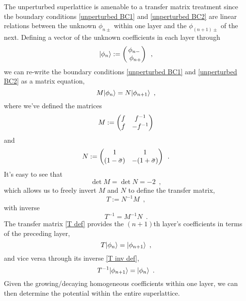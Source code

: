 The unperturbed superlattice is amenable to a transfer matrix treatment since the boundary conditions \eqref{unperturbed BC1} and \eqref{unperturbed BC2} are linear relations between the unknown $\phi_{n\pm}$ within one layer and the $\phi_{(n+1)\pm}$ of the next.  Defining a vector of the unknown coefficients in each layer through
\begin{equation}
    \label{phi vec def}
    \lvert\phi_n\rangle:=\begin{pmatrix}
    \phi_{n-}
    \\\
    \phi_{n+}
    \end{pmatrix}
    \,\,\,,
\end{equation}
we can re-write the boundary conditions \eqref{unperturbed BC1} and \eqref{unperturbed BC2} as a matrix equation,
\begin{equation}
    \label{matrix BC}
    M\lvert\phi_n\rangle= N\lvert\phi_{n+1}\rangle
    \,\,\,,
\end{equation}
where we've defined the matrices
\begin{equation}
    \label{M def}
    M:=\begin{pmatrix}
    f & f^{-1}
    \\
    f & -f^{-1}
    \end{pmatrix}
\end{equation}
and
\begin{equation}
    \label{N def}
    N:=
    \begin{pmatrix}
    1 & 1
    \\
    (1-\bar\sigma) & -(1+\bar \sigma)
    \end{pmatrix}
    \,\,\,.
\end{equation}
It's easy to see that 
\begin{equation}
    \label{M and N det}
    \det M = \det N = -2
    \,\,\,,
\end{equation}
which allows us to freely invert $M$ and $N$ to define the transfer matrix,
\begin{equation}
    \label{T def}
    T:= N^{-1} M
    \,\,\,,
\end{equation}
with inverse
\begin{equation}
    \label{T inv def}
    T^{-1} = M^{-1} N
    \,\,\,.
\end{equation}
The transfer matrix \eqref{T def} provides the $(n+1)$th layer's coefficients in terms of the preceding layer,
\begin{equation}
    \label{T action}
    T\lvert\phi_n\rangle = \lvert\phi_{n+1}\rangle
    \,\,\,,
\end{equation}
and vice versa through its inverse \eqref{T inv def},
\begin{equation}
    \label{T inv action}
    T^{-1}\lvert\phi_{n+1}\rangle = \lvert\phi_n\rangle
    \,\,\,.
\end{equation}
Given the growing/decaying homogeneous coefficients within one layer, we can then determine the potential within the entire superlattice.

